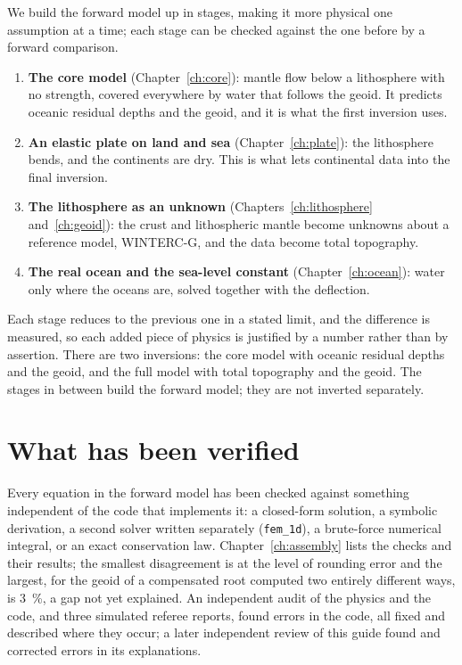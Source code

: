 We build the forward model up in stages, making it more physical one assumption at a time; each stage can be checked against the one before by a forward comparison.
\begin{enumerate}[nosep]
\item \textbf{The core model} (Chapter~\ref{ch:core}): mantle flow below a lithosphere with no strength, covered everywhere by water that follows the geoid.
It predicts oceanic residual depths and the geoid, and it is what the first inversion uses.
\item \textbf{An elastic plate on land and sea} (Chapter~\ref{ch:plate}): the lithosphere bends, and the continents are dry.
This is what lets continental data into the final inversion.
\item \textbf{The lithosphere as an unknown} (Chapters~\ref{ch:lithosphere} and~\ref{ch:geoid}): the crust and lithospheric mantle become unknowns about a reference model, WINTERC-G, and the data become total topography.
\item \textbf{The real ocean and the sea-level constant} (Chapter~\ref{ch:ocean}): water only where the oceans are, solved together with the deflection.
\end{enumerate}
Each stage reduces to the previous one in a stated limit, and the difference is measured, so each added piece of physics is justified by a number rather than by assertion.
There are two inversions: the core model with oceanic residual depths and the geoid, and the full model with total topography and the geoid.
The stages in between build the forward model; they are not inverted separately.

\section*{What has been verified}
Every equation in the forward model has been checked against something independent of the code that implements it: a closed-form solution, a symbolic derivation, a second solver written separately (\texttt{fem\_1d}), a brute-force numerical integral, or an exact conservation law.
Chapter~\ref{ch:assembly} lists the checks and their results; the smallest disagreement is at the level of rounding error and the largest, for the geoid of a compensated root computed two entirely different ways, is \qty{3}{\percent}, a gap not yet explained.
An independent audit of the physics and the code, and three simulated referee reports, found errors in the code, all fixed and described where they occur; a later independent review of this guide found and corrected errors in its explanations.
